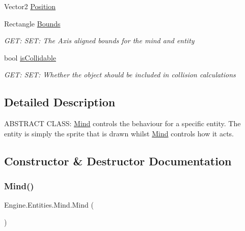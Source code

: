\begin{DoxyCompactItemize}
Vector2 \hyperlink{a00318_ad94b3975c0873fee06b5bd5a75bd38cd}{Position}
\item 
Rectangle \hyperlink{a00318_aa5a4c4b1e6b8373a14ee5e1a57a8ad54}{Bounds}
\begin{DoxyCompactList}\small\item\em G\+ET\+: S\+ET\+: The Axis aligned bounds for the mind and entity \end{DoxyCompactList}\item 
bool \hyperlink{a00318_a4bf63dff33c53406b5342eb45e9627c4}{is\+Collidable}
\begin{DoxyCompactList}\small\item\em G\+ET\+: S\+ET\+: Whether the object should be included in collision calculations \end{DoxyCompactList}\end{DoxyCompactItemize}


\subsection{Detailed Description}
A\+B\+S\+T\+R\+A\+CT C\+L\+A\+SS\+: \hyperlink{a00318}{Mind} controls the behaviour for a specific entity. The entity is simply the sprite that is drawn whilst \hyperlink{a00318}{Mind} controls how it acts. 



\subsection{Constructor \& Destructor Documentation}
\mbox{\label{a00318_aa352dcc92860d1304d4b1c71a0fe5d96}} 
\subsubsection{\texorpdfstring{Mind()}{Mind()}}
{\footnotesize\ttfamily Engine.\+Entities.\+Mind.\+Mind (\begin{DoxyParamCaption}{ }\end{DoxyParamCaption})\hspace{0.3cm}{\ttfamily [inline]}}



